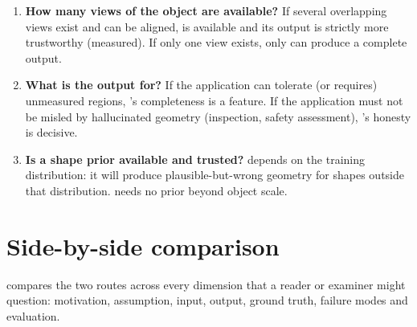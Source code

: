 \begin{enumerate}
  \item \textbf{How many views of the object are available?} If several
  overlapping views exist and can be aligned, \routeA{} is available and its
  output is strictly more trustworthy (measured). If only one view exists,
  only \routeB{} can produce a complete output.
  \item \textbf{What is the output for?} If the application can tolerate (or
  requires) unmeasured regions, \routeB{}'s completeness is a feature. If the
  application must not be misled by hallucinated geometry (inspection, safety
  assessment), \routeA{}'s honesty is decisive.
  \item \textbf{Is a shape prior available and trusted?} \routeB{} depends on
  the training distribution: it will produce plausible-but-wrong geometry for
  shapes outside that distribution. \routeA{} needs no prior beyond object
  scale.
\end{enumerate}

\section{Side-by-side comparison}
\label{sec:cmp_table}

 compares the two routes across every dimension
that a reader or examiner might question: motivation, assumption, input,
output, ground truth, failure modes and evaluation.

